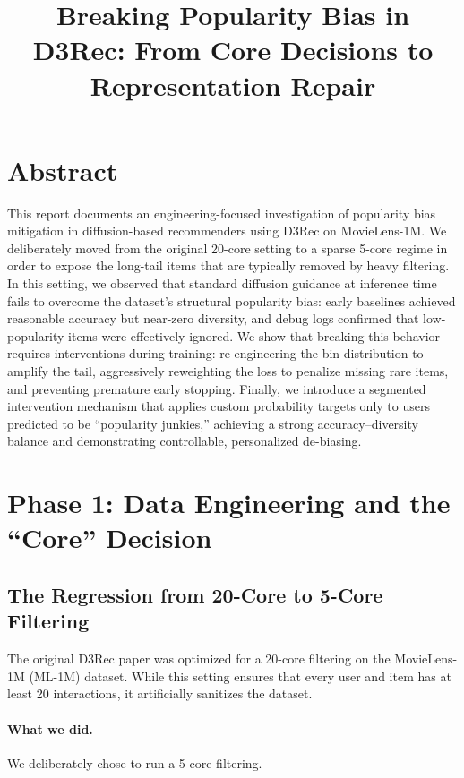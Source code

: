\documentclass[11pt,a4paper]{article}
\title{Breaking Popularity Bias in D3Rec: From Core Decisions to Representation Repair}
\author{}
\date{}
\begin{document}
\maketitle

\section*{Abstract}
This report documents an engineering-focused investigation of popularity bias mitigation in diffusion-based recommenders using D3Rec on MovieLens-1M. We deliberately moved from the original 20-core setting to a sparse 5-core regime in order to expose the long-tail items that are typically removed by heavy filtering. In this setting, we observed that standard diffusion guidance at inference time fails to overcome the dataset’s structural popularity bias: early baselines achieved reasonable accuracy but near-zero diversity, and debug logs confirmed that low-popularity items were effectively ignored. We show that breaking this behavior requires interventions during training: re-engineering the bin distribution to amplify the tail, aggressively reweighting the loss to penalize missing rare items, and preventing premature early stopping. Finally, we introduce a segmented intervention mechanism that applies custom probability targets only to users predicted to be ``popularity junkies,'' achieving a strong accuracy--diversity balance and demonstrating controllable, personalized de-biasing.

\section{Phase 1: Data Engineering and the ``Core'' Decision}

\subsection{The Regression from 20-Core to 5-Core Filtering}
The original D3Rec paper was optimized for a 20-core filtering on the MovieLens-1M (ML-1M) dataset. While this setting ensures that every user and item has at least 20 interactions, it artificially sanitizes the dataset.

\paragraph{What we did.}
We deliberately chose to run a 5-core filtering.
\end{document}
